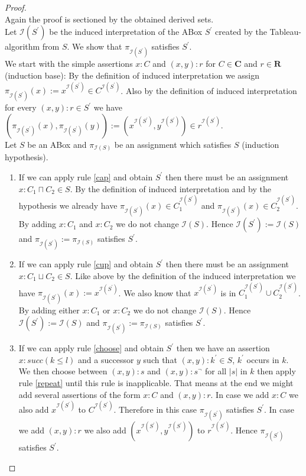 \documentclass[a4paper,11pt]{scrartcl}
\theoremstyle{break}
\theoremstyle{definition}
\begin{document}
\begin{proof}$ $\\
Again the proof is sectioned by the obtained derived sets.\\
Let $\mathcal{I}(S^\prime)$ be the induced interpretation of the ABox $S^\prime$ created by the Tableau-algorithm from $S$. We show that $\pi_{\mathcal{I}(S^\prime)}$ satisfies $S^\prime$.\\
We start with the simple assertions $x:C$ and $(x,y):r$ for $C\in\mathbf{C}$ and $r\in\mathbf{R}$ (induction base): By the definition of induced interpretation we assign $\pi_{\mathcal{I}(S^\prime)}(x):=x^{\mathcal{I}(S^\prime)}\in C^{\mathcal{I}(S^\prime)}$. Also by the definition of induced interpretation for every $(x,y):r\in S^\prime$ we have $(\pi_{\mathcal{I}(S^\prime)}(x),\pi_{\mathcal{I}(S^\prime)}(y)):=(x^{\mathcal{I}(S^\prime)},y^{\mathcal{I}(S^\prime)})\in r^{\mathcal{I}(S^\prime)}$.\\
Let $S$ be an ABox and $\pi_{\mathcal{I}(S)}$ be an assignment which satisfies $S$ (induction hypothesis).
\begin{enumerate}
\item If we can apply rule \ref{cap} and obtain $S^\prime$ then there must be an assignment $x:C_1\sqcap C_2\in S$. By the definition of induced interpretation and by the hypothesis we already have $\pi_{\mathcal{I}(S^\prime)}(x)\in C_1^{\mathcal{I}(S^\prime)}$ and $\pi_{\mathcal{I}(S^\prime)}(x)\in C_2^{\mathcal{I}(S^\prime)}$. By adding $x:C_1$ and $x:C_2$ we do not change $\mathcal{I}(S)$. Hence $\mathcal{I}(S^\prime):=\mathcal{I}(S)$ and $\pi_{\mathcal{I}(S^\prime)}:=\pi_{\mathcal{I}(S)}$ satisfies $S^\prime$.
\item If we can apply rule \ref{cup} and obtain $S^\prime$ then there must be an assignment $x:C_1\sqcup C_2\in S$. Like above by the definition of the induced interpretation we have $\pi_{\mathcal{I}(S^\prime)}(x):=x^{\mathcal{I}(S^\prime)}$. We also know that $x^{\mathcal{I}(S^\prime)}$ is in $C_1^{\mathcal{I}(S^\prime)}\cup C_2^{\mathcal{I}(S^\prime)}$. By adding either $x:C_1$ or $x:C_2$ we do not change $\mathcal{I}(S)$. Hence $\mathcal{I}(S^\prime):=\mathcal{I}(S)$ and $\pi_{\mathcal{I}(S^\prime)}:=\pi_{\mathcal{I}(S)}$ satisfies $S^\prime$.
\item If we can apply rule \ref{choose} and obtain $S^\prime$ then we have an assertion $x:succ(k\leq l)$ and a successor $y$ such that $(x,y):k^\prime\in S$, $k^\prime$ occurs in $k$. We then choose between $(x,y):s$ and $(x,y):s^\neg$ for all $|s|$ in $k$ then apply rule \ref{repeat} until this rule is inapplicable. That means at the end we might add several assertions of the form $x:C$ and $(x,y):r$. In case we add $x:C$ we also add $x^{\mathcal{I}(S^\prime)}$ to $C^{\mathcal{I}(S^\prime)}$. Therefore in this case $\pi_{\mathcal{I}(S^\prime)}$ satisfies $S^\prime$. In case we add $(x,y):r$ we also add $(x^{\mathcal{I}(S^\prime)},y^{\mathcal{I}(S^\prime)})$ to $r^{\mathcal{I}(S^\prime)}$. Hence $\pi_{\mathcal{I}(S^\prime)}$ satisfies $S^\prime$.

\end{enumerate}
\end{proof}
\end{document}
